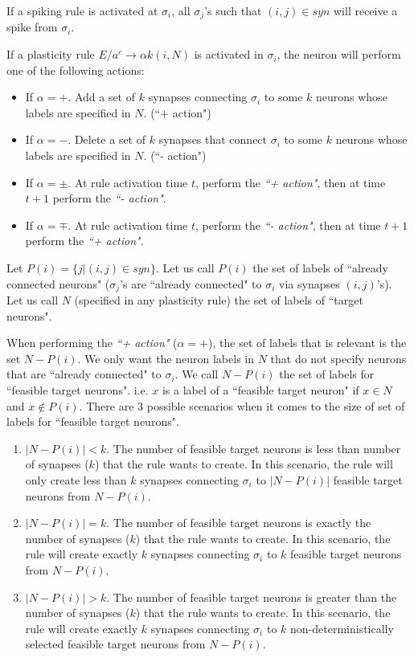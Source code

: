 \documentclass[smallextended]{svjour3}
\begin{document}
If a spiking rule is activated at $\sigma_i$, all $\sigma_j$'s such that $(i,j) \in syn$ will receive a spike from $\sigma_i$.
  
If a plasticity rule $E/a^c \rightarrow \alpha k(i, {N})$ is activated in $\sigma_i$, the neuron will perform one of the following actions:
\begin{itemize}
   \item If $\alpha = +$. Add a set of $k$ synapses connecting $\sigma_i$ to some $k$ neurons whose labels are specified in $N$. (``+ action")
   \item If $\alpha = -$. Delete a set of $k$ synapses that connect $\sigma_i$ to some $k$ neurons whose labels are specified in $N$. (``- action")
   \item If $\alpha = \pm$. At rule activation time $t$, perform the \textit{``+ action"}, then at time $t+1$ perform the \textit{``- action"}.
   \item If $\alpha = \mp$. At rule activation time $t$, perform the \textit{``- action"}, then at time $t+1$ perform the \textit{``+ action"}.
\end{itemize}
  
Let $P(i) = \{j|(i,j)\in syn\}$. Let us call $P(i)$ the set of labels of ``already connected neurons" ($\sigma_j$'s are ``already connected" to 
$\sigma_i$ via synapses $(i,j)$'s). Let us call $N$ (specified in any plasticity rule) the set of labels of ``target neurons".

When performing the \textit{``+ action"} ($\alpha = +$), the set of labels that is relevant is the set $N-P(i)$. We only want the neuron labels 
in $N$ that do not specify neurons that are ``already connected" to $\sigma_i$. We call $N-P(i)$  the set of labels for ``feasible target neurons". 
i.e. $x$ is a label of a ``feasible target neuron" if $x \in N$ and $x \not\in P(i)$. There are 3 possible scenarios when it comes to the size of
set of labels for ``feasible target neurons". 
\begin{enumerate}
   \item $|N-P(i)| < k$. The number of feasible target neurons is less than number of synapses ($k$) that the rule wants to create. In this scenario,
         the rule will only create less than $k$ synapses connecting $\sigma_i$ to $|N-P(i)|$ feasible target neurons from $N-P(i)$.
   \item $|N-P(i)| = k$. The number of feasible target neurons is exactly the number of synapses ($k$) that the rule wants to create. In this 
         scenario, the rule will create exactly $k$ synapses connecting $\sigma_i$ to $k$ feasible target neurons from $N-P(i)$.
   \item $|N-P(i)| > k$. The number of feasible target neurons is greater than the number of synapses ($k$) that the rule wants to create. In this 
         scenario, the rule will create exactly $k$ synapses connecting $\sigma_i$ to $k$ non-deterministically selected feasible target neurons from 
         $N-P(i)$.
\end{enumerate}
\end{document}
